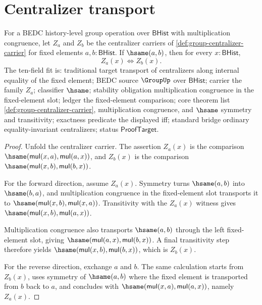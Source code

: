 \section{Centralizer transport}
\label{sec:group-centralizer-transport}

\begin{theorem}
\label{thm:group-centralizer-fixed-element-transport}
For a BEDC history-level group operation over $\mathsf{BHist}$ with
multiplication congruence, let $Z_a$ and $Z_b$ be the centralizer carriers of
\autoref{def:group-centralizer-carrier} for fixed elements
$a,b:\mathsf{BHist}$. If $\hsame(a,b)$, then for every
$x:\mathsf{BHist}$,
$$
Z_a(x) \Longleftrightarrow Z_b(x).
$$
The ten-field fit is: traditional target transport of centralizers along
internal equality of the fixed element; BEDC source $\GroupUp$ over
$\mathsf{BHist}$; carrier the family $Z_a$; classifier $\hsame$; stability
obligation multiplication congruence in the fixed-element slot; ledger the
fixed-element comparison; core theorem list
\autoref{def:group-centralizer-carrier}, multiplication congruence, and
$\hsame$ symmetry and transitivity; exactness predicate the displayed iff;
standard bridge ordinary equality-invariant centralizers; status
$\mathsf{ProofTarget}$.
\end{theorem}
\begin{proof}
Unfold the centralizer carrier. The assertion $Z_a(x)$ is the comparison
$\hsame(\mathsf{mul}(x,a),\mathsf{mul}(a,x))$, and $Z_b(x)$ is the
comparison $\hsame(\mathsf{mul}(x,b),\mathsf{mul}(b,x))$.

For the forward direction, assume $Z_a(x)$. Symmetry turns
$\hsame(a,b)$ into $\hsame(b,a)$, and multiplication congruence in the
fixed-element slot transports it to
$\hsame(\mathsf{mul}(x,b),\mathsf{mul}(x,a))$. Transitivity with the
$Z_a(x)$ witness gives
$\hsame(\mathsf{mul}(x,b),\mathsf{mul}(a,x))$.

Multiplication congruence also transports $\hsame(a,b)$ through the left
fixed-element slot, giving
$\hsame(\mathsf{mul}(a,x),\mathsf{mul}(b,x))$. A final transitivity step
therefore yields
$\hsame(\mathsf{mul}(x,b),\mathsf{mul}(b,x))$, which is $Z_b(x)$.

For the reverse direction, exchange $a$ and $b$. The same calculation starts
from $Z_b(x)$, uses symmetry of $\hsame(a,b)$ where the fixed element is
transported from $b$ back to $a$, and concludes with
$\hsame(\mathsf{mul}(x,a),\mathsf{mul}(a,x))$, namely $Z_a(x)$.
\end{proof}
